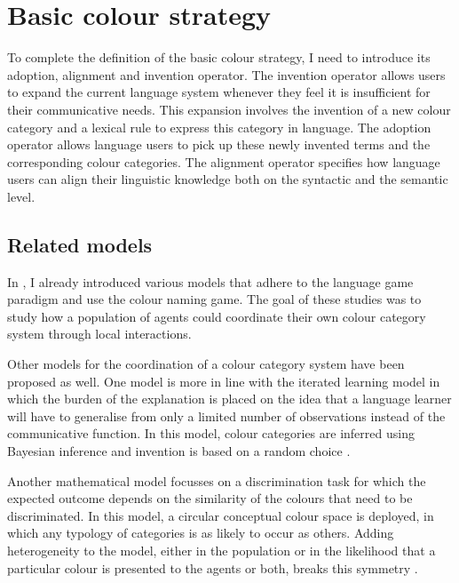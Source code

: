\chapter{Basic colour strategy}
\label{s:basic-operators}

\setcounter{figure}{1}

To complete the definition of the basic colour strategy, I need
to introduce its adoption, alignment and invention operator. The
invention operator allows users to expand the current language system
whenever they feel it is insufficient for their communicative
needs. This expansion involves the invention of a new colour category
and a lexical rule to express this category in language. The adoption
operator allows language users to pick up these newly invented terms
and the corresponding colour categories. The alignment operator
specifies how language users can align their linguistic knowledge both
on the syntactic and the semantic level.

\section{Related models}

In , I already introduced various models
\citep{steels05coordinating, belpaeme05explaining, belpaeme07language,
  puglisi08cultural, baronchelli10modeling} that adhere to the
language game paradigm and use the colour naming game. The goal of
these studies was to study how a population of agents could coordinate
their own colour category system through local interactions.

Other models for the coordination of a colour category system have
been proposed as well. One model is more in line with the iterated
learning model \citep{smith03iterated} in which the burden of the
explanation is placed on the idea that a language learner will have to
generalise from only a limited number of observations instead of the
communicative function. In this model, colour categories are inferred
using Bayesian inference and invention is based on a random choice
\citep{dowman07explaining}.

Another mathematical model focusses on a discrimination task for which
the expected outcome depends on the similarity of the colours that
need to be discriminated. In this model, a circular conceptual colour
space is deployed, in which any typology of categories is as likely to
occur as others. Adding heterogeneity to the model, either in the
population or in the likelihood that a particular colour is presented
to the agents or both, breaks this symmetry
\citep{komarova08population}.

